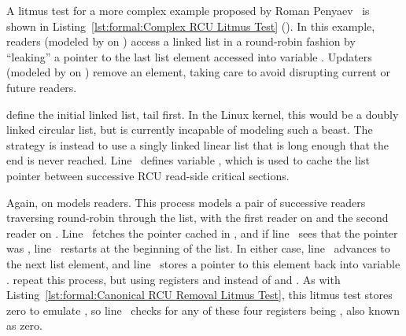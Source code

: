 \begin{fcvref}
A litmus test for a more complex example proposed by
Roman Penyaev~\cite{RomanPenyaev2018rrRCU} is shown in
Listing~\ref{lst:formal:Complex RCU Litmus Test}
().
In this example, readers (modeled by  on
) access a linked list
in a round-robin fashion by ``leaking'' a pointer to the last
list element accessed into variable .
Updaters (modeled by  on )
remove an element, taking care to avoid disrupting current or future
readers.

\QuickQuizEnd

 define the initial linked
list, tail first.
In the Linux kernel, this would be a doubly linked circular list,
but  is currently incapable of modeling such a beast.
The strategy is instead to use a singly linked linear list that
is long enough that the end is never reached.
Line~ defines variable , which is used to
cache the list pointer between successive RCU read-side critical
sections.

Again,  on  models readers.
This process models a pair of successive readers traversing round-robin
through the list, with the first reader on 
and the second reader on .
Line~ fetches the pointer cached in , and if
line~ sees that the pointer was ,
line~ restarts at the beginning of the list.
In either case, line~ advances to the next list element,
and line~ stores a pointer to this element back into
variable .
 repeat this process, but using
registers  and  instead of  and .
As with
Listing~\ref{lst:formal:Canonical RCU Removal Litmus Test},
this litmus test stores zero to emulate , so
line~ checks for any of these four registers being
, also known as zero.


\end{fcvref}
